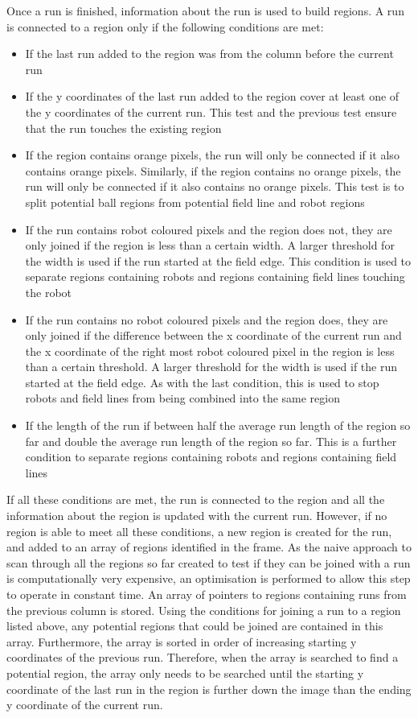 \documentclass[pdftex,11pt,a4paper]{report}
\begin{document}
Once a run is finished, information about the run is used to build regions. A run is connected to a region only if the following conditions are met: \begin{itemize}
\item{If the last run added to the region was from the column before the current run}
\item{If the y coordinates of the last run added to the region cover at least one of the y coordinates of the current run. This test and the previous test ensure that the run touches the existing region}
\item{If the region contains orange pixels, the run will only be connected if it also contains orange pixels. Similarly, if the region contains no orange pixels, the run will only be connected if it also contains no orange pixels. This test is to split potential ball regions from potential field line and robot regions}
\item{If the run contains robot coloured pixels and the region does not, they are only joined if the region is less than a certain width. A larger threshold for the width is used if the run started at the field edge. This condition is used to separate regions containing robots and regions containing field lines touching the robot}
\item{If the run contains no robot coloured pixels and the region does, they are only joined if the difference between the x coordinate of the current run and the x coordinate of the right most robot coloured pixel in the region is less than a certain threshold. A larger threshold for the width is used if the run started at the field edge. As with the last condition, this is used to stop robots and field lines from being combined into the same region}
\item{If the length of the run if between half the average run length of the region so far and double the average run length of the region so far. This is a further condition to separate regions containing robots and regions containing field lines}
\end{itemize}
If all these conditions are met, the run is connected to the region and all the information about the region is updated with the current run. However, if no region is able to meet all these conditions, a new region is created for the run, and added to an array of regions identified in the frame. As the naive approach to scan through all the regions so far created to test if they can be joined with a run is computationally very expensive, an optimisation is performed to allow this step to operate in constant time. An array of pointers to regions containing runs from the previous column is stored. Using the conditions for joining a run to a region listed above, any potential regions that could be joined are contained in this array. Furthermore, the array is sorted in order of increasing starting y coordinates of the previous run. Therefore, when the array is searched to find a potential region, the array only needs to be searched until the starting y coordinate of the last run in the region is further down the image than the ending y coordinate of the current run. 
\end{document}
